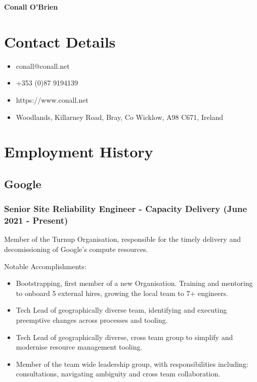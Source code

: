 \documentclass[a4paper, 10pt] {article}
\begin{document}
\begingroup
  \centering
  \LARGE \textbf{Conall O'Brien}\\[1.5em]
\endgroup

\section*{Contact Details}

\begin{itemize}[itemsep=2pt,parsep=2pt]
 \item conall@conall.net
 \item +353 (0)87 9194139
 \item https://www.conall.net
 \item Woodlands, Killarney Road, Bray, Co Wicklow, A98 C671, Ireland
\end{itemize}

\hrulefill

\section*{Employment History}

\subsection*{Google}

\subsubsection*{Senior Site Reliability Engineer - Capacity Delivery (June 2021 - Present)}

Member of the Turnup Organisation, responsible for the timely delivery and
decomissioning of Google's compute resources.

\vspace{4mm}  %

Notable Accomplishments:

\begin{itemize}[itemsep=2pt,parsep=2pt]
  \item Bootstrapping, first member of a new Organisation. Training and mentoring to onboard 5 external hires, growing the local team to 7+ engineers.
  \item Tech Lead of geographically diverse team, identifying and executing preemptive changes across processes and tooling.
  \item Tech Lead of geographically diverse, cross team group to simplify and modernise resource management tooling.
  \item Member of the team wide leadership group, with responsibilities including: consultations, navigating ambiguity and cross team collaboration.
\end{itemize}
\end{document}
